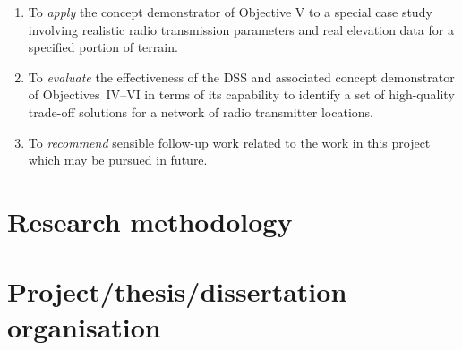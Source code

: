 \begin{enumerate}[label=\Roman*]
 \item To \textit{apply} the concept demonstrator of Objective V to a special case study involving realistic radio transmission parameters and real elevation data for a specified portion of terrain.
 \item To \textit{evaluate} the effectiveness of the DSS and associated concept demonstrator of Objectives~IV--VI in terms of its capability to identify a set of high-quality trade-off solutions for a network of radio transmitter locations.
 \item To \textit{recommend} sensible follow-up work related to the work in this project which may be pursued in future.
\end{enumerate}

\section{Research methodology}
\blindtext

\section{Project/thesis/dissertation organisation}
\blindtext